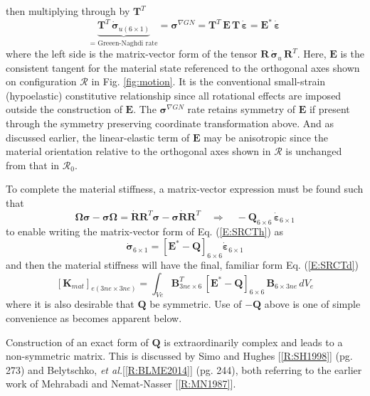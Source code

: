 \documentclass[11pt]{report}
\numberwithin{equation}{section}
\newcommand{\bmf } {\boldsymbol }  %
\newcommand{\ti}{\emph}
\newcommand{\etal}{\ti{et al.}\xspace}
\newcommand{\nid}{\noindent}
\newcommand{\vareps}{\varepsilon}
\newcommand{\region}{\bm{\mathcal{R}}}
\newcommand{\dotR} {\dot{\mathbf{R}}}
\begin{document}
%
then multiplying through by $\mathbf{T}^T$
%
\begin{equation}\label{E:SRCTn}
\underbrace{\mathbf{T}^T\,\dot{\bmf{\sigma}}_{u( 6 \times 1)} }_{\text{= Greeen-Naghdi rate}}= 
\bmf{\sigma}^{\nabla GN}=\mathbf{T}^T\, \mathbf{E}\,\mathbf{T}\, \dot{\bmf{\vareps}}=
 \mathbf{E}^*\, \dot{\bmf{\vareps}}
\end{equation}
%
\nid where the left side is the matrix-vector form of the tensor  
$\mathbf{R}\,\dot {\bmf{\sigma}}_u \,\mathbf{R}^T$. Here, $\mathbf{E}$ is the
consistent tangent for the material state referenced to the orthogonal axes
shown on configuration $\region$ in Fig. \ref{fig:motion}. It is the conventional small-strain 
(hypoelastic) constitutive relationship since all rotational effects are imposed outside the construction
of  $\mathbf{E}$. The $\bmf{\sigma}^{\nabla GN}$ rate retains symmetry of $\mathbf{E}$ if present through the
symmetry preserving coordinate transformation above. And as discussed earlier, the linear-elastic
term of $\mathbf{E}$ may be 
anisotropic since the material orientation relative to the orthogonal axes shown in $\region$ is
unchanged from that in $\region_0$.

To complete the material stiffness, a matrix-vector expression must be found such that
%
\begin{equation}\label{E:SRCTo}
\mathbf{\Omega}\bmf{\sigma} -
	\bmf{\sigma}\mathbf{\Omega}=\dotR \mathbf{R}^T\bmf{\sigma} -
	\bmf{\sigma}\dotR \mathbf{R}^T \quad \Rightarrow \quad 
	-\mathbf{Q}_{6\times 6}\,  \dot{\bmf{\vareps}}_{6\times 1}
\end{equation}
%
\nid to enable writing the matrix-vector form of Eq. (\ref{E:SRCTh}) as
%
\begin{equation}\label{E:SRCTp}
\dot{\bmf{\sigma}}_{6\times 1}= \left [  \mathbf{E}^* -\mathbf{Q} \right ]_{6\times 6} 
\dot{\bmf{\vareps}}_{6\times 1}
\end{equation}
%
\nid and then the material stiffness will have the final, familiar form Eq. (\ref{E:SRCTd})
%
\begin{equation}\label{E:SRCTq}
 \left [ \mathbf{K}_{mat} \right ]_{e(3ne \times 3ne)}= \int_{Ve} \mathbf{B}^T_{3ne\times 6} \,
 \left [  \mathbf{E}^* -\mathbf{Q} \right ]_{6\times 6} \,\mathbf{B}_{6\times 3ne}\, dV_e
\end{equation}
%
\nid where it is also desirable that $\mathbf{Q}$ be symmetric. Use of $-\mathbf{Q}$ above
is one of simple convenience as becomes apparent below.

Construction of an exact form of $\mathbf{Q}$ is extraordinarily complex and leads to a
non-symmetric matrix. This is discussed by Simo and Hughes  [\ref{R:SH1998}] (pg. 273) and
Belytschko, \etal [\ref{R:BLME2014}] (pg. 244), both referring to the earlier work of 
Mehrabadi and Nemat-Nasser [\ref{R:MN1987}].
\end{document}
